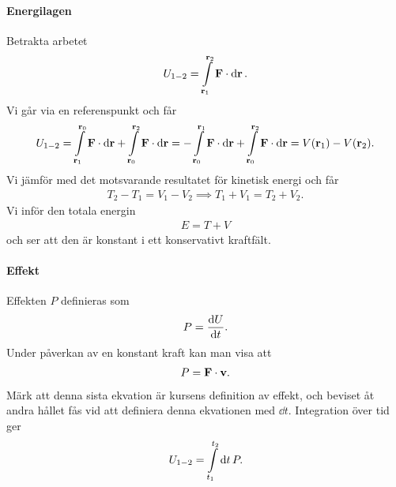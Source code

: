 \paragraph{Energilagen}
Betrakta arbetet
\begin{align*}
	U_{1 - 2} = \int\limits_{\vb{r}_1}^{\vb{r}_2}\vb{\vb{F}}\cdot\dd{\vb{r}}.
\end{align*}
Vi går via en referenspunkt och får
\begin{align*}
	U_{1 - 2} = \int\limits_{\vb{r}_1}^{\vb{r}_0}\vb{\vb{F}}\cdot\dd{\vb{r}} + \int\limits_{\vb{r}_0}^{\vb{r}_2}\vb{\vb{F}}\cdot\dd{\vb{r}} = -\int\limits_{\vb{r}_0}^{\vb{r}_1}\vb{\vb{F}}\cdot\dd{\vb{r}} + \int\limits_{\vb{r}_0}^{\vb{r}_2}\vb{\vb{F}}\cdot\dd{\vb{r}} = V(\vb{r}_1) - V(\vb{r}_2).
\end{align*}
Vi jämför med det motsvarande resultatet för kinetisk energi och får
\begin{align*}
	T_2 - T_1 = V_1 - V_2\implies T_1 + V_1 = T_2 + V_2.
\end{align*}
Vi inför den totala energin
\begin{align*}
	E = T + V
\end{align*}
och ser att den är konstant i ett konservativt kraftfält.

\paragraph{Effekt}
Effekten $P$ definieras som
\begin{align*}
	P = \dv{U}{t}.
\end{align*}
Under påverkan av en konstant kraft kan man visa att
\begin{align*}
	P = \vb{F}\cdot\vb{v}.
\end{align*}
Märk att denna sista ekvation är kursens definition av effekt, och beviset åt andra hållet fås vid att definiera denna ekvationen med $\dd{t}$. Integration över tid ger
\begin{align*}
	U_{1 - 2} = \int\limits_{t_1}^{t_2}\dd{t}P.
\end{align*}